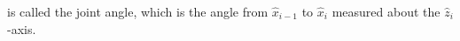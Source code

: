 \documentclass[preview]{standalone}
\begin{document}
\begin{center}
is called the joint angle, which is the angle from $\hat{x}_{i-1}$ to $\hat{x}_{i}$ measured about the $\hat{z}_{i}$-axis.
\end{center}
\end{document}
